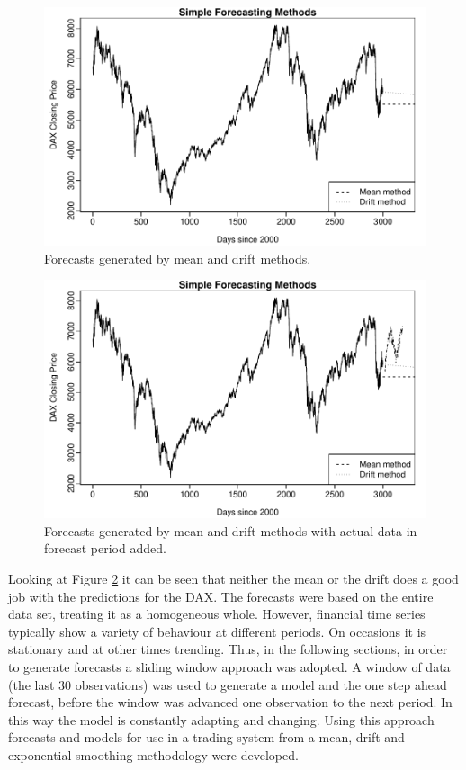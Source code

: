 

\begin{figure}[tbh]
\centering
\includegraphics{Figures/chp_ts_dax1}
\caption[Forecasts generated by mean and drift methods]{Forecasts generated by mean and drift methods.}
\label{fig:chp5_ts_dax}
\end{figure}

\begin{figure}[tbh]
\centering
\includegraphics{Figures/chp_ts_dax1_plus_act_data}
\caption[Forecasts generated by mean and drift methods and actual data]{Forecasts generated by mean and drift methods with actual data in forecast period added.}
\label{fig:chp_ts_dax_act}
\end{figure}

Looking at Figure \ref{fig:chp_ts_dax_act} it can be seen that neither the mean or the drift does a good job with the predictions for the DAX. The forecasts were based on the entire data set, treating it as a homogeneous whole. However, financial time series typically show a variety of behaviour at different periods. On occasions it is stationary and at other times trending. Thus, in the following sections, in order to generate forecasts a sliding window approach was adopted. A window of data (the last 30 observations) was used to generate a model and the one step ahead forecast, before the window was advanced one observation to the next period. In this way the model is constantly adapting and changing. Using this approach forecasts and models for use in a trading system from a mean, drift and exponential smoothing methodology were developed.

